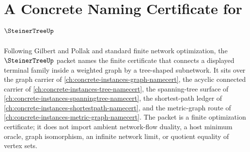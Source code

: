 \chapter{A Concrete Naming Certificate for $\SteinerTreeUp$}
\label{ch:concrete-instances-steiner-tree-namecert}

Following Gilbert and Pollak and standard finite network optimization, the
$\SteinerTreeUp$ packet names the finite certificate that connects a displayed
terminal family inside a weighted graph by a tree-shaped subnetwork. It sits
over the graph carrier of \autoref{ch:concrete-instances-graph-namecert}, the
acyclic connected carrier of \autoref{ch:concrete-instances-tree-namecert},
the spanning-tree surface of
\autoref{ch:concrete-instances-spanningtree-namecert}, the shortest-path
ledger of \autoref{ch:concrete-instances-shortestpath-namecert}, and the
metric-graph route of \autoref{ch:concrete-instances-metric-graph-namecert}.
The packet is a finite optimization certificate; it does not import ambient
network-flow duality, a host minimum oracle, graph isomorphism, an infinite
network limit, or quotient equality of vertex sets.

